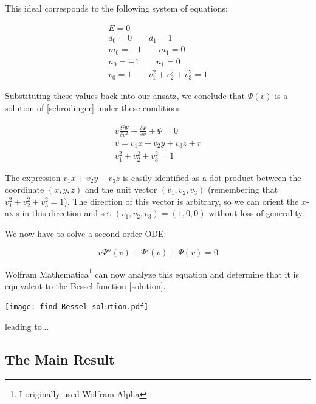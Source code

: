 \documentclass{article}
\begin{document}
This ideal corresponds to the following system of equations:

\begin{equation}
\begin{gathered}
E = 0 \\
d_0 = 0 \qquad
d_1 = 1 \\
m_0 = -1 \qquad
m_1 = 0 \\
n_0 = -1 \qquad
n_1 = 0 \\
v_0 = 1 \qquad
v_1^2 + v_2^2 + v_3^2 = 1
\end{gathered}
\end{equation}

Substituting these values back into our ansatz, we conclude that $\Psi(v)$
is a solution of \eqref{schrodinger} under these conditions:

\begin{equation}
\label{related solution}
\begin{gathered}
v \frac{\delta^2\Psi}{\delta v^2} + \frac{\delta\Psi}{\delta v} + \Psi = 0 \\
v = v_1 x+ v_2 y+ v_3 z+r \\
v_1^2 + v_2^2 + v_3^2 = 1
\end{gathered}
\end{equation}

The expression $v_1 x + v_2 y + v_3 z$ is easily identified as a dot product between
the coordinate $(x,y,z)$ and the unit vector $(v_1, v_2, v_3)$ (remembering
that $v_1^2 + v_2^2 + v_3^2 = 1$).  The direction of this vector is arbitrary,
so we can orient the $x$-axis in this direction and set $(v_1, v_2, v_3) = (1,0,0)$
without loss of generality.

We now have to solve a second order ODE:

\begin{equation}
v \Psi''(v) + \Psi'(v) + \Psi(v) = 0
\end{equation}

Wolfram Mathematica\footnote{I originally used Wolfram Alpha} can now
analyze this equation and determine that it is equivalent
to the Bessel function \eqref{solution}.

\texttt{[image: find Bessel solution.pdf]}

leading to...

\vfill\eject

\subsection*{The Main Result}
\parskip 0pt
\end{document}
